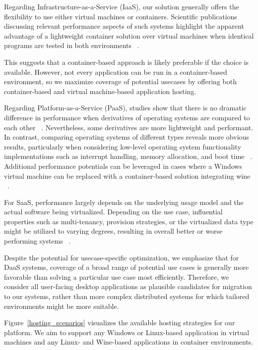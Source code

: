 \documentclass[runningheads]{llncs}
\begin{document}
Regarding Infrastructure-as-a-Service (IaaS),
our solution generally offers the flexibility
to use either virtual machines or containers.
Scientific publications discussing relevant performance aspects of such systems
highlight the apparent advantage of a lightweight container solution
over virtual machines when identical programs are tested in both environments
~\cite{felter2015updated,potdar2020performance,seo2014performance}.

This suggests that a container-based approach is likely preferable
if the choice is available.
However, not every application can be run
in a container-based environment,
so we maximize coverage of potential usecases
by offering both container-based and virtual machine-based application hosting.

Regarding Platform-as-a-Service (PaaS),
studies show that there is no dramatic difference in performance
when derivatives of operating systems are compared to each other
~\cite{balen2020performance,boras2020performance}.
Nevertheless, some derivatives are more lightweight and performant.
In contrast, comparing operating systems of different types
reveals more obvious results, particularly when considering
low-level operating system functionality implementations
such as interrupt handling, memory allocation, and boot time
~\cite{sergeev2022docker,sulaiman2021comparison}.
Additional performance potentials can be leveraged
in cases where a Windows virtual machine can be replaced
with a container-based solution integrating wine
~\cite{huang2012performance}.  %

For SaaS, performance largely depends on the underlying usage model
and the actual software being virtualized.
Depending on the use case, influential properties
such as multi-tenancy, provision strategies, or the virtualized data type
might be utilized to varying degrees, resulting in overall
better or worse performing systems ~\cite{zhong2010virtualization}.

Despite the potential for usecase-specific optimization,
we emphasize that for DaaS systems,
coverage of a broad range of potential use cases is generally more favorable
than solving a particular use case most efficiently.
Therefore, we consider all user-facing desktop applications
as plausible candidates for migration to our systems,
rather than more complex distributed systems
for which tailored environments might be more suitable.


Figure~\ref{hosting_scenarios} visualizes the available hosting strategies for our platform.
We aim to support any Windows or Linux-based application in virtual machines
and any Linux- and Wine-based applications in container environments.
\end{document}
